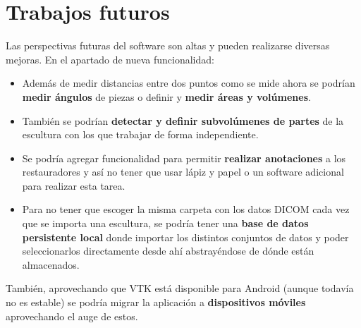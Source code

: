 \section{Trabajos futuros}

Las perspectivas futuras del software son altas y pueden realizarse diversas mejoras. En el apartado de nueva funcionalidad:

\begin{itemize}
	\item Además de medir distancias entre dos puntos como se mide ahora se podrían \textbf{medir ángulos} de piezas o definir y \textbf{medir áreas y volúmenes}.
	\item También se podrían \textbf{detectar y definir subvolúmenes de partes} de la escultura con los que trabajar de forma independiente.
	\item Se podría agregar funcionalidad para permitir \textbf{realizar anotaciones} a los restauradores y así no tener que usar lápiz y papel o un software adicional para realizar esta tarea.
	\item Para no tener que escoger la misma carpeta con los datos DICOM cada vez que se importa una escultura, se podría tener una \textbf{base de datos persistente local} donde importar los distintos conjuntos de datos y poder seleccionarlos directamente desde ahí abstrayéndose de dónde están almacenados.
\end{itemize}

También, aprovechando que VTK está disponible para Android (aunque todavía no es estable) se podría migrar la aplicación a \textbf{dispositivos móviles} aprovechando el auge de estos.